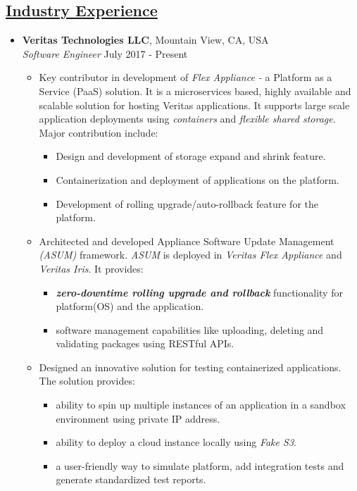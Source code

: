\documentclass[10pt]{article}
\begin{document}
\subsection*{\underline{Industry Experience}}
\vspace{-0.1cm}
\begin{itemize}[leftmargin=0.15in]
\item {\bfseries Veritas Technologies LLC}, Mountain View, CA, USA \\
{\sl Software Engineer}  \hfill July 2017 - Present
\vspace{-0.15cm}
\begin{itemize}
\setlength{\itemsep}{0.4em}%
\item Key contributor in development of \textit{Flex Appliance -} a Platform as a Service (PaaS) solution. It is a microservices based, highly available and scalable solution for hosting Veritas applications. It supports large scale application deployments using \textit{containers} and \textit{flexible shared storage}. Major contribution include:
\begin{itemize}
\item Design and development of storage expand and shrink feature.
\item Containerization and deployment of applications on the platform.
\item Development of rolling upgrade/auto-rollback feature for the platform.
\end{itemize}

\item Architected and developed Appliance Software Update Management \textit{(ASUM)} framework. \textit{ASUM} is deployed in \textit{Veritas Flex Appliance} and \textit{Veritas Iris}. It provides:
\begin{itemize}
\item \textbf{\textit {zero-downtime rolling upgrade and rollback}} functionality for platform(OS) and the application.
\item software management capabilities like uploading, deleting and validating packages using RESTful APIs.
\end{itemize}

\item Designed an innovative solution for testing containerized applications. The solution provides:
\begin{itemize}
\item ability to spin up multiple instances of an application in a sandbox environment using private IP address.
\item ability to deploy a cloud instance locally using \textit{Fake S3}.
\item a user-friendly way to simulate platform, add integration tests and generate standardized test reports.
\end{itemize}


\end{itemize}
\end{itemize}
\end{document}
